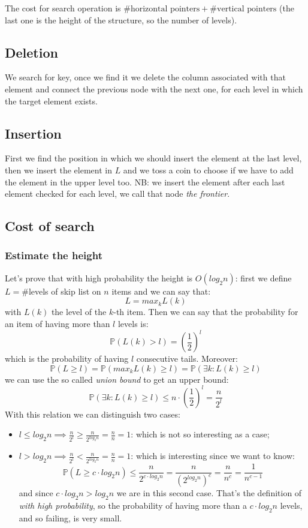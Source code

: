 The cost for search operation is $\#\text{horizontal pointers} + \#\text{vertical pointers}$ (the last one is the height of the structure, so the number of levels).

\subsection{Deletion}
We search for key, once we find it we delete the column associated with that element and connect the previous node with the next one, for each level in which the target element exists.

\subsection{Insertion}
First we find the position in which we should insert the element at the last level, then we insert the element in $L$ and we toss a coin to choose if we have to add the element in the upper level too.
NB: we insert the element after each last element checked for each level, we call that node \emph{the frontier}.

\subsection{Cost of search}
\subsubsection{Estimate the height}
Let's prove that with high probability the height is $O(log_2 n)$: first we define $L = \#$levels of skip list on $n$ items and we can say that:
$$
    L = max_k L(k)
$$
with $L(k)$ the level of the $k$-th item.
Then we can say that the probability for an item of having more than $l$ levels is:
$$
    \mathbb{P}(L(k) > l) = \left( \frac{1}{2} \right)^l
$$
which is the probability of having $l$ consecutive tails.
Moreover:
$$
    \mathbb{P}(L \geq l) = \mathbb{P}(max_k L(k) \geq l) = \mathbb{P}(\exists k : L(k) \geq l)
$$
we can use the so called \emph{union bound} to get an upper bound:
$$
    \mathbb{P}(\exists k : L(k) \geq l) \leq n \cdot \left( \frac{1}{2} \right)^l = \frac{n}{2^l}
$$
With this relation we can distinguish two cases:
\begin{itemize}
    \item $l \leq log_2 n \implies \frac{n}{2^l} \geq \frac{n}{2^{log_2 n}} = \frac{n}{n} = 1$: which is not so interesting as a case;
    \item $l > log_2 n \implies \frac{n}{2^l} < \frac{n}{2^{log_2 n}} = \frac{n}{n} = 1$: which is interesting since we want to know:
    $$
        \mathbb{P}(L \geq c \cdot log_2 n) \leq \frac{n}{2^{c \cdot log_2 n}} = \frac{n}{(2^{log_2 n})^c} = \frac{n}{n^c} = \frac{1}{n^{c-1}}
    $$
    and since $c \cdot log_2 n > log_2 n$ we are in this second case.
    That's the definition of \emph{with high probability}, so the probability of having more than a $c \cdot log_2 n$ levels, and so failing, is very small.
\end{itemize}

